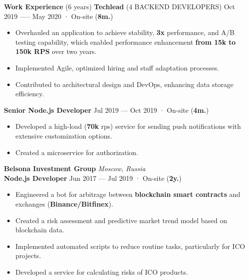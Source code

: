 \documentclass{resume}
\begin{document}
\begin{rSection}{\textbf{Work Experience} (6 years) }
\textbf{Techlead} (4 BACKEND DEVELOPERS) \hfill Oct 2019 —-- May 2020 · On-site ({\textbf{8m.}})
\begin{itemize}
    \item Overhauled an application to achieve stability, \textbf{3x} performance, and A/B testing capability,
    which enabled performance enhancement \textbf{from 15k to 150k RPS} over two years\@.
    \item Implemented Agile, optimized hiring and staff adaptation processes\@.
    \item Contributed to architectural design and DevOps, enhancing data storage efficiency\@.
\end{itemize}

\textbf{Senior Node.js Developer} \hfill Jul 2019 --- Oct 2019 · On-site ({\textbf{4m.}})
\begin{itemize}
    \item Developed a high-load (\textbf{70k} rps) service for sending push notifications with extensive customization options\@.
    \item Created a microservice for authorization\@.
\end{itemize}

\textbf{Belsona Investment Group} \hfill \textit{Moscow, Russia} \\
\textbf{Node.js Developer}  \hfill Jun 2017 --- Jul 2019 · On-site ({\textbf{2y.}})

\begin{itemize}
    \item Engineered a bot for arbitrage between \textbf{blockchain smart contracts} and exchanges (\textbf{Binance/Bitfinex})\@.
    \item Created a risk assessment and predictive market trend model based on blockchain data\@.
    \item Implemented automated scripts to reduce routine tasks, particularly for ICO projects\@.
    \item Developed a service for calculating risks of ICO products\@.
\end{itemize}

\end{rSection}
\end{document}
